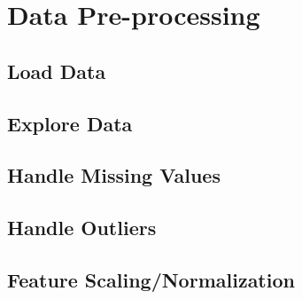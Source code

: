 \section{Data Pre-processing}
\subsection{Load Data}
\subsection{Explore Data}
\subsection{Handle Missing Values}
\subsection{Handle Outliers}
\subsection{Feature Scaling/Normalization}

\newpage